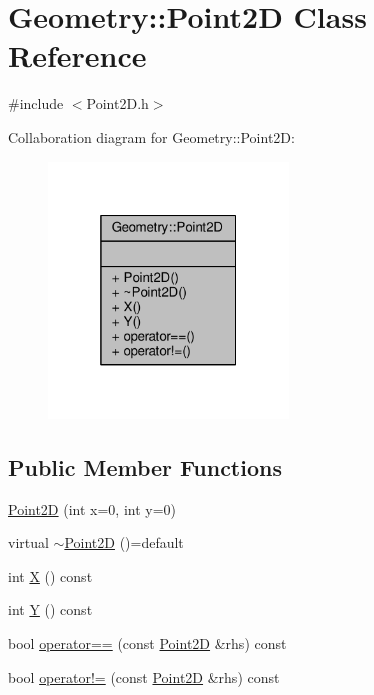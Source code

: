 \hypertarget{classGeometry_1_1Point2D}{}\section{Geometry\+:\+:Point2\+D Class Reference}
\label{classGeometry_1_1Point2D}


{\ttfamily \#include $<$Point2\+D.\+h$>$}



Collaboration diagram for Geometry\+:\+:Point2\+D\+:\nopagebreak
\begin{figure}[H]
\begin{center}
\leavevmode
\includegraphics[width=181pt]{classGeometry_1_1Point2D__coll__graph}
\end{center}
\end{figure}
\subsection*{Public Member Functions}
\begin{DoxyCompactItemize}
\item 
\hyperlink{classGeometry_1_1Point2D_a42092d242b11d790d973712bacd02b72}{Point2\+D} (int x=0, int y=0)
\item 
virtual \hyperlink{classGeometry_1_1Point2D_a2347379e70ce2907fc497557217e10a3}{$\sim$\+Point2\+D} ()=default
\item 
int \hyperlink{classGeometry_1_1Point2D_a611f7bf916d94767b61b0c8c9fbeae55}{X} () const 
\item 
int \hyperlink{classGeometry_1_1Point2D_a078150b19312c0a7f466021b7c7ff320}{Y} () const 
\item 
bool \hyperlink{classGeometry_1_1Point2D_a7ce87ad250d9a716df2d293f8af2accf}{operator==} (const \hyperlink{classGeometry_1_1Point2D}{Point2\+D} \&rhs) const 
\item 
bool \hyperlink{classGeometry_1_1Point2D_ad97232d7ab2ef71fd78c80796b1654b8}{operator!=} (const \hyperlink{classGeometry_1_1Point2D}{Point2\+D} \&rhs) const 
\end{DoxyCompactItemize}
